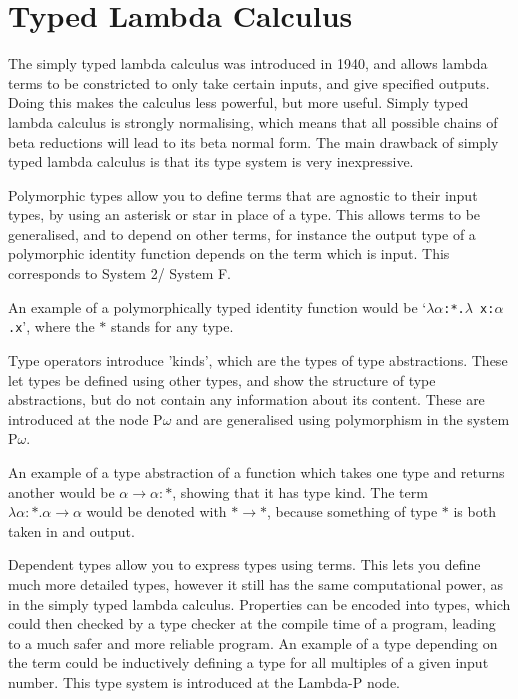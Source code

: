 \documentclass{l4proj}
\begin{document}
\section{Typed Lambda Calculus}

The simply typed lambda calculus was introduced in 1940, and allows lambda terms to be constricted to only take certain inputs, and give specified outputs.  Doing this makes the calculus less powerful, but more useful.  Simply typed lambda calculus is strongly normalising, which means that all possible chains of beta reductions will lead to its beta normal form.  The main drawback of simply typed lambda calculus is that its type system is very inexpressive.

Polymorphic types allow you to define terms that are agnostic to their input types, by using an asterisk or star in place of a type.  This allows terms to be generalised, and to depend on other terms, for instance the output type of a polymorphic identity function depends on the term which is input.  This corresponds to System 2/ System F.

An example of a polymorphically typed identity function would be `\texttt{$\lambda \alpha$:*.$\lambda$ x:$\alpha$.x}', where the $*$ stands for any type.

Type operators introduce 'kinds', which are the types of type abstractions.  These let types be defined using other types, and show the structure of type abstractions, but do not contain any information about its content.  These are introduced at the node P\underline{$\omega$} and are generalised using polymorphism in the system P$\omega$.

An example of a type abstraction of a function which takes one type and returns another would be \texttt{$\alpha \longrightarrow \alpha : * $}, showing that it has type kind.  The term \texttt{ $\lambda \alpha : *  . \alpha \longrightarrow \alpha$} would be denoted with \texttt{$* \longrightarrow *$}, because something of type $*$ is both taken in and output.

Dependent types allow you to express types using terms.  This lets you define much more detailed types, however it still has the same computational power, as in the simply typed lambda calculus.  Properties can be encoded into types, which could then checked by a type checker at the compile time of a program, leading to a much safer and more reliable program.  An example of a type depending on the term could be inductively defining a type for all multiples of a given input number.  This type system is introduced at the Lambda-P node.
\end{document}
